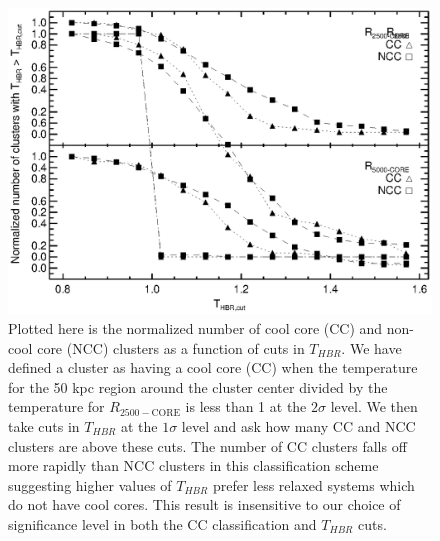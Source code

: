 \clearpage
\begin{figure}[htp]
\begin{center}
\includegraphics[scale=1.0]{cc_ncc_bin}
\caption{\small
Plotted here is the normalized number of cool core (CC) and non-cool core
(NCC) clusters as a function of cuts in $T_{HBR}$. We have defined a
cluster as having a cool core (CC) when the temperature for the 50 kpc
region around the cluster center divided by the temperature for
$R_{2500-\mathrm{CORE}}$ is less than 1 at the $2\sigma$ level. We then
take cuts in $T_{HBR}$ at the $1\sigma$ level and ask how many CC and
NCC clusters are above these cuts. The number of CC clusters falls off
more rapidly than NCC clusters in this classification scheme
suggesting higher values of $T_{HBR}$ prefer less relaxed systems
which do not have cool cores. This result is insensitive to our choice
of significance level in both the CC classification and $T_{HBR}$
cuts.
}
\label{fig:cc_ncc_bin}
\end{center}
\end{figure}

